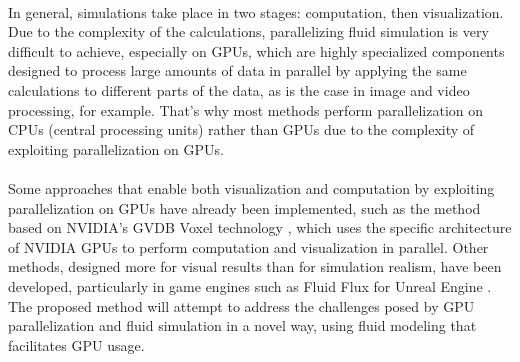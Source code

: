\documentclass{article}
\begin{document}
\paragraph{}{
In general, simulations take place in two stages: computation, then visualization.
Due to the complexity of the calculations, parallelizing fluid simulation is very difficult to achieve, especially on GPUs, which are highly specialized components designed to process large amounts of data in parallel by applying the same calculations to different parts of the data, as is the case in image and video processing, for example. %
That's why most methods perform parallelization on CPUs (central processing units) rather than GPUs due to the complexity of exploiting parallelization on GPUs.
}


\paragraph{}{
Some approaches that enable both visualization and computation by exploiting parallelization on GPUs have already been implemented, such as the method based on NVIDIA's GVDB Voxel technology \cite{wuFastFluidSimulations2018}, which uses the specific architecture of NVIDIA GPUs to perform computation and visualization in parallel.
Other methods, designed more for visual results than for simulation realism, have been developed, particularly in game engines such as Fluid Flux for Unreal Engine \cite{FluidFluxDocumentation}.
The proposed method will attempt to address the challenges posed by GPU parallelization and fluid simulation in a novel way, using fluid modeling that facilitates GPU usage.
} 
\end{document}
